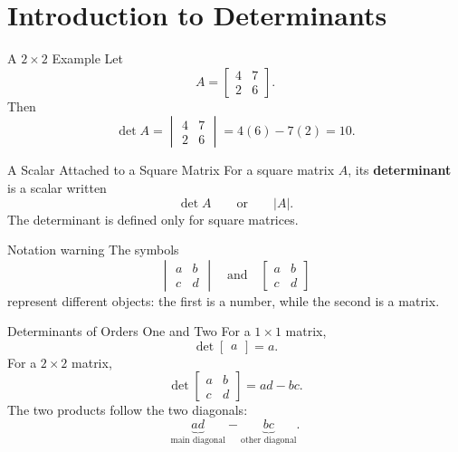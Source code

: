 \section[Introduction]{Introduction to Determinants}

\begin{frame}{A $2\times2$ Example}
Let
\[
A=\begin{bmatrix}4&7\\2&6\end{bmatrix}.
\]
Then
\[
\det A
=\begin{vmatrix}4&7\\2&6\end{vmatrix}
=4(6)-7(2)
=10.
\]
\end{frame}

\begin{frame}{A Scalar Attached to a Square Matrix}
For a square matrix $A$, its \textbf{determinant} is a scalar written
\[
\det A
\qquad\text{or}\qquad
|A|.
\]
\pause
The determinant is defined only for square matrices.
\medskip

\begin{alertblock}{Notation warning}
The symbols
\[
\begin{vmatrix}a&b\\c&d\end{vmatrix}
\quad\text{and}\quad
\begin{bmatrix}a&b\\c&d\end{bmatrix}
\]
represent different objects: the first is a number, while the second is a matrix.
\end{alertblock}
\end{frame}

\begin{frame}{Determinants of Orders One and Two}
For a $1\times1$ matrix,
\[
\det\begin{bmatrix}a\end{bmatrix}=a.
\]
\pause
For a $2\times2$ matrix,
\[
\det\begin{bmatrix}a&b\\c&d\end{bmatrix}
=ad-bc.
\]
\pause
The two products follow the two diagonals:
\[
\underbrace{ad}_{\text{main diagonal}}
-
\underbrace{bc}_{\text{other diagonal}}.
\]
\end{frame}

